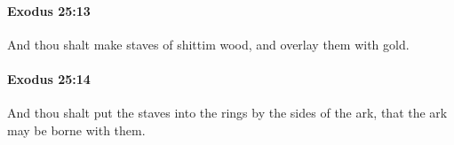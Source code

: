 		\paragraph{Exodus 25:13} %
			\label{EXODUS-25-13}

			And thou shalt make staves of shittim wood, and overlay them with gold.


		\paragraph{Exodus 25:14} %
			\label{EXODUS-25-14}

			And thou shalt put the staves into the rings by the sides of the ark, that the ark may be borne with them.


